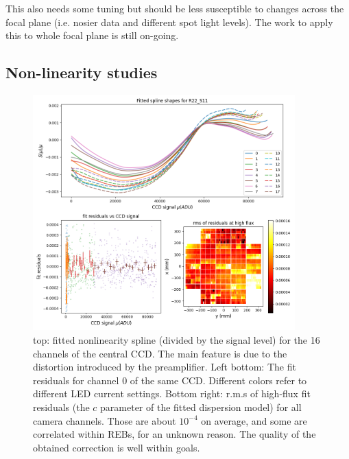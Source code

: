 This also needs some tuning but should be less susceptible to changes across the focal plane (i.e. nosier data and different spot light levels). The work to apply this to whole focal plane is still on-going.

\clearpage
\subsection{Non-linearity studies}\label{nonlinearity}
\begin{figure}[ht]
\begin{centering}
\includegraphics[width=0.9\textwidth]{figures/nonlin_plots.png}
\end{centering}
\caption{top: fitted nonlinearity spline (divided by the signal level) for the 16 channels of the central CCD. The main feature is due to the distortion introduced by the preamplifier. Left bottom: The fit residuals for channel 0 of the same CCD. Different colors refer to different LED current settings. Bottom right: r.m.s of high-flux fit residuals (the $c$ parameter of the fitted dispersion model) for all camera channels. Those are about $10^{-4}$ on average, and some are correlated within REBs, for an unknown reason. The quality of the obtained correction is well within goals.\label{fig:nonlin_model}}

\end{figure}

